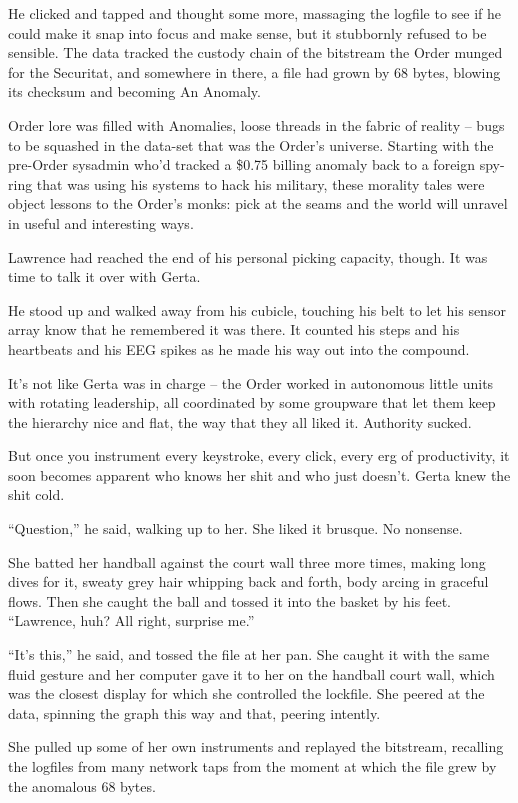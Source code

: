 He clicked and tapped and thought some more, massaging the logfile to 
see if he could make it snap into focus and make sense, but it 
stubbornly refused to be sensible. The data tracked the custody chain 
of the bitstream the Order munged for the Securitat, and somewhere in 
there, a file had grown by 68 bytes, blowing its checksum and becoming 
An Anomaly.

Order lore was filled with Anomalies, loose threads in the fabric of 
reality -- bugs to be squashed in the data-set that was the Order's 
universe. Starting with the pre-Order sysadmin who'd tracked a \$0.75 
billing anomaly back to a foreign spy-ring that was using his systems 
to hack his military, these morality tales were object lessons to the 
Order's monks: pick at the seams and the world will unravel in useful 
and interesting ways.

Lawrence had reached the end of his personal picking capacity, though. 
It was time to talk it over with Gerta.

He stood up and walked away from his cubicle, touching his belt to let 
his sensor array know that he remembered it was there. It counted his 
steps and his heartbeats and his EEG spikes as he made his way out into 
the compound.

It's not like Gerta was in charge -- the Order worked in autonomous 
little units with rotating leadership, all coordinated by some 
groupware that let them keep the hierarchy nice and flat, the way that 
they all liked it. Authority sucked.

But once you instrument every keystroke, every click, every erg of 
productivity, it soon becomes apparent who knows her shit and who just 
doesn't. Gerta knew the shit cold.

“Question,” he said, walking up to her. She liked it brusque. No 
nonsense.

She batted her handball against the court wall three more times, making 
long dives for it, sweaty grey hair whipping back and forth, body 
arcing in graceful flows. Then she caught the ball and tossed it into 
the basket by his feet. “Lawrence, huh? All right, surprise me.”

“It's this,” he said, and tossed the file at her pan. She caught it 
with the same fluid gesture and her computer gave it to her on the 
handball court wall, which was the closest display for which she 
controlled the lockfile. She peered at the data, spinning the graph 
this way and that, peering intently.

She pulled up some of her own instruments and replayed the bitstream, 
recalling the logfiles from many network taps from the moment at which 
the file grew by the anomalous 68 bytes.

